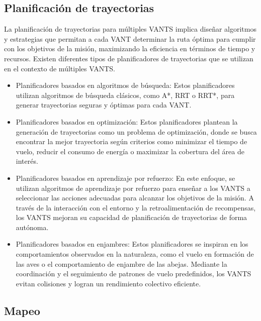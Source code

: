 \documentclass[sigconf]{acmart}
\begin{document}
\subsection*{Planificación de trayectorias}

La planificación de trayectorias para múltiples VANTS implica diseñar algoritmos y estrategias que permitan a cada VANT determinar la ruta óptima para cumplir con los objetivos de la misión, maximizando la eficiencia en términos de tiempo y recursos. Existen diferentes tipos de planificadores de trayectorias que se utilizan en el contexto de múltiples VANTS.

\begin{itemize}
  
\item Planificadores basados en algoritmos de búsqueda: Estos planificadores utilizan algoritmos de búsqueda clásicos, como A*, RRT o RRT*, para generar trayectorias seguras y óptimas para cada VANT.

\item Planificadores basados en optimización: Estos planificadores plantean la generación de trayectorias como un problema de optimización, donde se busca encontrar la mejor trayectoria según criterios como minimizar el tiempo de vuelo, reducir el consumo de energía o maximizar la cobertura del área de interés.
  
\item Planificadores basados en aprendizaje por refuerzo: En este enfoque, se utilizan algoritmos de aprendizaje por refuerzo para enseñar a los VANTS a seleccionar las acciones adecuadas para alcanzar los objetivos de la misión. A través de la interacción con el entorno y la retroalimentación de recompensas, los VANTS mejoran su capacidad de planificación de trayectorias de forma autónoma.

\item Planificadores basados en enjambres: Estos planificadores se inspiran en los comportamientos observados en la naturaleza, como el vuelo en formación de las aves o el comportamiento de enjambre de las abejas. Mediante la coordinación y el seguimiento de patrones de vuelo predefinidos, los VANTS evitan colisiones y logran un rendimiento colectivo eficiente.
  
\end{itemize}

\subsection*{Mapeo}
\end{document}
